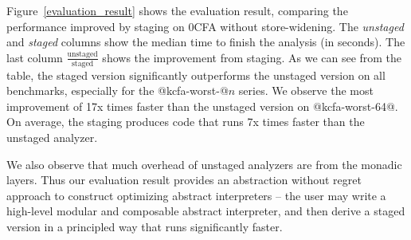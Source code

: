 Figure~\ref{evaluation_result} shows the evaluation result, comparing the
performance improved by staging on 0CFA without store-widening. The
\textit{unstaged} and \textit{staged} columns show the median time to finish the
analysis (in seconds). The last column $\frac{\text{unstaged}}{\text{staged}}$
shows the improvement from staging. 
As we can see from the table, the staged version significantly outperforms the
unstaged version on all benchmarks, especially for the @kcfa-worst-@$n$ series.
We observe the most improvement of 17x times faster than the unstaged version on
@kcfa-worst-64@. On average, the staging produces code that runs 7x times faster
than the unstaged analyzer.

We also observe that much overhead of unstaged analyzers are from the monadic
layers. Thus our evaluation result provides an abstraction without regret
approach to construct optimizing abstract interpreters -- the user may write a
high-level modular and composable abstract interpreter, and then derive a staged
version in a principled way that runs significantly faster.

\iffalse
As we can see from the table, the staged version significantly outperforms the
unstaged especially for the difficult ones. However, for some benchmarks, we
observe degraded performance. We conjecture this happens due to the fact that
the large size of the generated code is unoptimized -- as what we test here is a
simple implementation almost identical to what we described in the previous
sections, we believe the performance still can be improved if more engineering
effort is taken, such as optimizing code generation and avoiding code
duplication.
\fi
